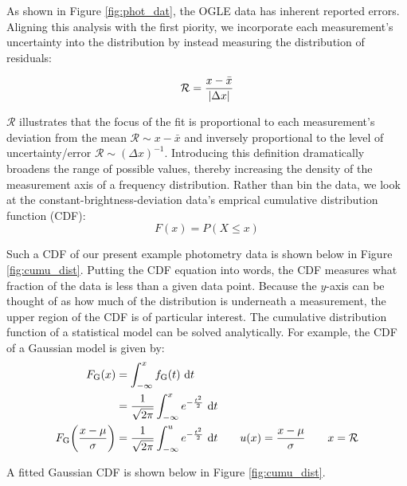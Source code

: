 \documentclass[12pt, a4paper]{article}
\begin{document}
As shown in Figure \ref{fig:phot_dat}, the OGLE data has inherent reported errors.
Aligning this analysis with the first piority, we incorporate each measurement's uncertainty into the distribution by instead measuring the distribution of residuals:

\begin{equation}%
\mathcal{R} = \frac{x - \bar x}{\vqty{\Delta x}}
\end{equation}

$\mathcal{R}$ illustrates that the focus of the fit is proportional to each measurement's deviation from the mean
 $\mathcal{R} \sim x-\bar x$
and inversely proportional to the level of uncertainty/error
$\mathcal{R} \sim (\Delta x)^{-1}$.
Introducing this definition dramatically broadens the range of possible values, thereby increasing the density of the measurement axis of a frequency distribution.
Rather than bin the data, we look at the constant-brightness-deviation data's emprical cumulative distribution function (CDF):
\[ F(x) = P(X \leq x) \]

Such a CDF of our present example photometry data is shown below in Figure \ref{fig:cumu_dist}.
Putting the CDF equation into words, the CDF measures what fraction of the data is less than a given data point.
Because the $y$-axis can be thought of as how much of the distribution is underneath a measurement, the upper region of the CDF is of particular interest.
The cumulative distribution function of a statistical model can be solved analytically. For example, the CDF of a Gaussian model is given by:
\begin{equation*}
\begin{aligned}
F_{\mathrm G}(x) &= \int_{-\infty}^x f_{\mathrm G}(t)\ \dd t
\\&= \frac{1}{\sqrt{2 \pi}}
\int _{-\infty}^x e^{-\frac{t^2}{2}}\ \dd t
\\ F_{\mathrm G}\pqty{\frac{x-\mu}{\sigma}}
&= \frac{1}{\sqrt{2 \pi}}
\int _{-\infty}^u e^{-\frac{t^2}{2}}\ \dd t
\qquad
u(x) = \frac{x-\mu}{\sigma}
\qquad
x = \mathcal{R}
\end{aligned}
\end{equation*}

A fitted Gaussian CDF is shown below in Figure \ref{fig:cumu_dist}.
\end{document}
